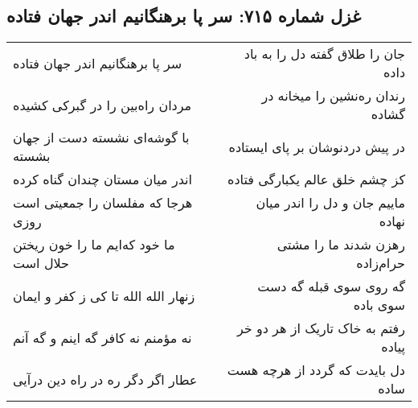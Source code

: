 \begin{center}
\section*{غزل شماره ۷۱۵: سر پا برهنگانیم اندر جهان فتاده}
\label{sec:715}
\begin{longtable}{l p{0.5cm} r}
سر پا برهنگانیم اندر جهان فتاده
&&
جان را طلاق گفته دل را به باد داده
\\
مردان راه‌بین را در گبرکی کشیده
&&
رندان ره‌نشین را میخانه در گشاده
\\
با گوشه‌ای نشسته دست از جهان بشسته
&&
در پیش دردنوشان بر پای ایستاده
\\
اندر میان مستان چندان گناه کرده
&&
کز چشم خلق عالم یکبارگی فتاده
\\
هرجا که مفلسان را جمعیتی است روزی
&&
ماییم جان و دل را اندر میان نهاده
\\
ما خود که‌ایم ما را خون ریختن حلال است
&&
رهزن شدند ما را مشتی حرام‌زاده
\\
زنهار الله الله تا کی ز کفر و ایمان
&&
گه روی سوی قبله گه دست سوی باده
\\
نه مؤمنم نه کافر گه اینم و گه آنم
&&
رفتم به خاک تاریک از هر دو خر پیاده
\\
عطار اگر دگر ره در راه دین درآیی
&&
دل بایدت که گردد از هرچه هست ساده
\\
\end{longtable}
\end{center}
